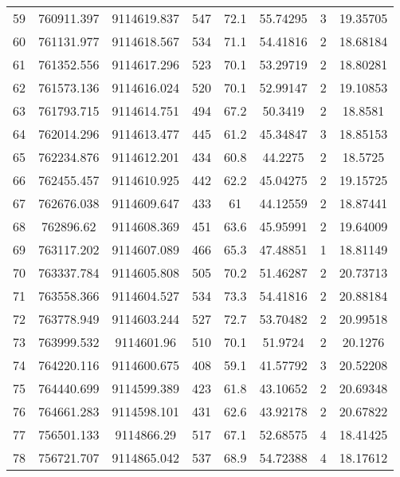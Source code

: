 \begin{longtable}{cccccccc}
59   & 760911.397      & 9114619.837      & 547     & 72.1  & 55.74295 & 3  & 19.35705 \\
60   & 761131.977      & 9114618.567      & 534     & 71.1  & 54.41816 & 2  & 18.68184 \\
61   & 761352.556      & 9114617.296      & 523     & 70.1  & 53.29719 & 2  & 18.80281 \\
62   & 761573.136      & 9114616.024      & 520     & 70.1  & 52.99147 & 2  & 19.10853 \\
63   & 761793.715      & 9114614.751      & 494     & 67.2  & 50.3419  & 2  & 18.8581  \\
64   & 762014.296      & 9114613.477      & 445     & 61.2  & 45.34847 & 3  & 18.85153 \\
65   & 762234.876      & 9114612.201      & 434     & 60.8  & 44.2275  & 2  & 18.5725  \\
66   & 762455.457      & 9114610.925      & 442     & 62.2  & 45.04275 & 2  & 19.15725 \\
67   & 762676.038      & 9114609.647      & 433     & 61    & 44.12559 & 2  & 18.87441 \\
68   & 762896.62       & 9114608.369      & 451     & 63.6  & 45.95991 & 2  & 19.64009 \\
69   & 763117.202      & 9114607.089      & 466     & 65.3  & 47.48851 & 1  & 18.81149 \\
70   & 763337.784      & 9114605.808      & 505     & 70.2  & 51.46287 & 2  & 20.73713 \\
71   & 763558.366      & 9114604.527      & 534     & 73.3  & 54.41816 & 2  & 20.88184 \\
72   & 763778.949      & 9114603.244      & 527     & 72.7  & 53.70482 & 2  & 20.99518 \\
73   & 763999.532      & 9114601.96       & 510     & 70.1  & 51.9724  & 2  & 20.1276  \\
74   & 764220.116      & 9114600.675      & 408     & 59.1  & 41.57792 & 3  & 20.52208 \\
75   & 764440.699      & 9114599.389      & 423     & 61.8  & 43.10652 & 2  & 20.69348 \\
76   & 764661.283      & 9114598.101      & 431     & 62.6  & 43.92178 & 2  & 20.67822 \\
77   & 756501.133      & 9114866.29       & 517     & 67.1  & 52.68575 & 4  & 18.41425 \\
78   & 756721.707      & 9114865.042      & 537     & 68.9  & 54.72388 & 4  & 18.17612 \\

\end{longtable}
